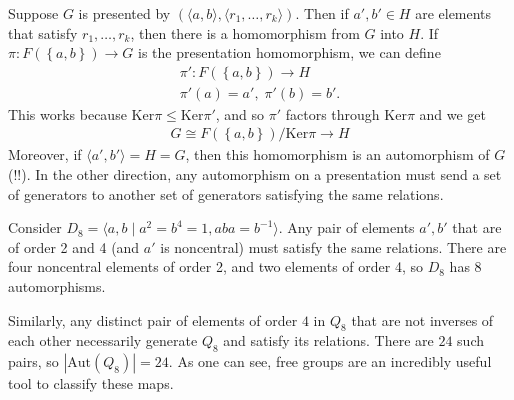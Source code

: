\documentclass{memoir}
\begin{document}
Suppose \(G\) is presented by \((\langle a,b \rangle , \langle r_1,\ldots,r_k \rangle )\). Then if \(a',b' \in H\) are elements that satisfy \(r_1,\ldots,r_k\), then there is a homomorphism from \(G\) into \(H\). If \(\pi :F(\left\{ a,b \right\} )\to G\) is the presentation homomorphism, we can define
\begin{align*}
	\pi ':F(\left\{ a,b \right\} ) \to H\\
	\pi'(a) = a', \; \pi'(b) = b'.
\end{align*}
This works because \(\textrm{Ker}\pi \leq \textrm{Ker}\pi'\), and so \(\pi '\) factors through \(\textrm{Ker}\pi \) and we get
\begin{align*}
	G \cong F(\left\{ a,b \right\} ) / \textrm{Ker}\pi \to H
\end{align*}
Moreover, if \(\langle a',b' \rangle = H = G\), then this homomorphism is an automorphism of \(G\)(!!). In the other direction, any automorphism on a presentation must send a set of generators to another set of generators satisfying the same relations.

\begin{exmp}
	Consider \(D_8 = \langle a,b \mid a^2 = b^{4} =1, aba = b^{-1} \rangle \). Any pair of elements \(a',b'\) that are of order 2 and 4 (and \(a'\) is noncentral) must satisfy the same relations. There are four noncentral elements of order 2, and two elements of order 4, so \(D_8\) has 8 automorphisms.
\end{exmp}
Similarly, any distinct pair of elements of order \(4\) in \(Q_8\) that are not inverses of each other necessarily generate \(Q_8\) and satisfy its relations. There are \(24\) such pairs, so \(\left| \textrm{Aut}(Q_8) \right| =24\). As one can see, free groups are an incredibly useful tool to classify these maps.

\end{document}
